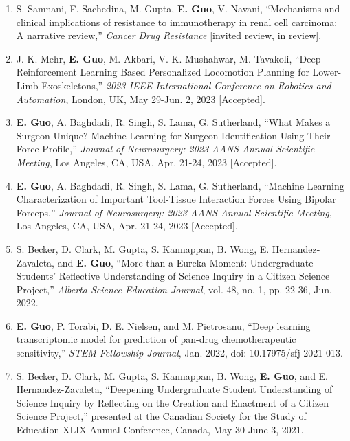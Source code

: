 \documentclass{article}
\begin{document}
\begin{enumerate}[itemsep=1em]
    \item S. Samnani, F. Sachedina, M. Gupta, \textbf{E. Guo}, V. Navani, ``Mechanisms and clinical implications of resistance to immunotherapy in renal cell carcinoma: A narrative review,'' \textit{Cancer Drug Resistance} [invited review, in review].
    \item J. K. Mehr, \textbf{E. Guo}, M. Akbari, V. K. Mushahwar, M. Tavakoli, ``Deep Reinforcement Learning Based Personalized Locomotion Planning for Lower-Limb Exoskeletons,'' \textit{2023 IEEE International Conference on Robotics and Automation}, London, UK, May 29-Jun. 2, 2023 [Accepted].
    \item \textbf{E. Guo}, A. Baghdadi, R. Singh, S. Lama, G. Sutherland, ``What Makes a Surgeon Unique? Machine Learning for Surgeon Identification Using Their Force Profile,'' \textit{Journal of Neurosurgery: 2023 AANS Annual Scientific Meeting}, Los Angeles, CA, USA, Apr. 21-24, 2023 [Accepted].
    \item \textbf{E. Guo}, A. Baghdadi, R. Singh, S. Lama, G. Sutherland, ``Machine Learning Characterization of Important Tool-Tissue Interaction Forces Using Bipolar Forceps,'' \textit{Journal of Neurosurgery: 2023 AANS Annual Scientific Meeting}, Los Angeles, CA, USA, Apr. 21-24, 2023 [Accepted].
    \item S. Becker, D. Clark, M. Gupta, S. Kannappan, B. Wong, E. Hernandez-Zavaleta, and \textbf{E. Guo}, ``More than a Eureka Moment: Undergraduate Students' Reflective Understanding of Science Inquiry in a Citizen Science Project,'' \textit{Alberta Science Education Journal}, vol. 48, no. 1, pp. 22-36, Jun. 2022.
    \item \textbf{E. Guo}, P. Torabi, D. E. Nielsen, and M. Pietrosanu, ``Deep learning transcriptomic model for prediction of pan-drug chemotherapeutic sensitivity,'' \textit{STEM Fellowship Journal}, Jan. 2022, doi: 10.17975/sfj-2021-013.
    \item S. Becker, D. Clark, M. Gupta, S. Kannappan, B. Wong, \textbf{E. Guo}, and E. Hernandez-Zavaleta, ``Deepening Undergraduate Student Understanding of Science Inquiry by Reflecting on the Creation and Enactment of a Citizen Science Project,'' presented at the Canadian Society for the Study of Education XLIX Annual Conference, Canada, May 30-June 3, 2021.
\end{enumerate}

\end{document}

